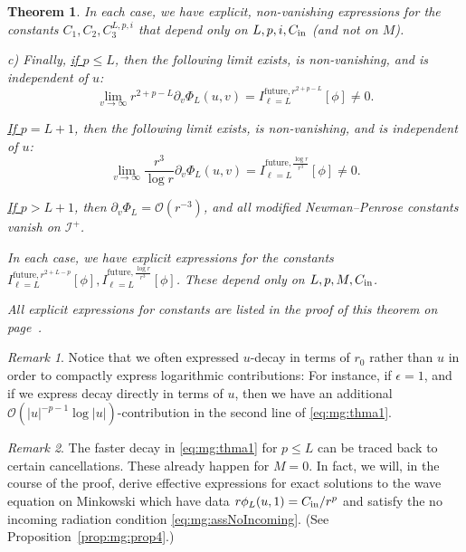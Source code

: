 \documentclass[11pt,english]{article}
\numberwithin{equation}{section}
\newtheorem{thm}{Theorem}[section]
\theoremstyle{remark}
\newtheorem{rem}{Remark}[section]
\theoremstyle{plain}
\theoremstyle{remark}
\newcommand{\pv}{\partial_v}
\renewcommand{\(}{\left(}
\renewcommand{\)}{\right)}
\begin{document}
\begin{thm}
In each case, we have explicit, non-vanishing expressions for the constants $C_1,C_2,C_3^{L,p,i}$ that depend only  on $L,p,i,C_{\mathrm{in}}$ (and not on $M$).

c) Finally, \underline{if $p\leq L$}, then the following limit exists, is non-vanishing, and is independent of $u$:
\begin{equation}\label{eq:mg:thmc1}
\lim_{v\to\infty}r^{2+p-L}\pv\Phi_L(u,v)=I^{\mathrm{future},r^{2+p-L}}_{\ell=L}[\phi]\neq 0.
\end{equation} 

\underline{If $p=L+1$}, then the following limit exists, is non-vanishing, and is independent of $u$:
\begin{equation}\label{eq:mg:thmc2}
\lim_{v\to\infty}\frac{r^3}{\log r}\pv\Phi_L(u,v)=I^{\mathrm{future},\frac{\log r}{r^3}}_{\ell=L}[\phi]\neq 0.
\end{equation} 

\underline{If $p>L+1$}, then $\pv\Phi_L=\mathcal O(r^{-3})$, and all modified Newman--Penrose constants vanish on $\mathcal I^+$.

In each case, we have explicit expressions for the constants $I^{\mathrm{future},r^{2+L-p}}_{\ell=L}[\phi],I^{\mathrm{future},\frac{\log r}{r^3}}_{\ell=L}[\phi]$. These depend only on $L,p,M,C_{\mathrm{in}}$.

All explicit expressions for constants are listed in the proof of this theorem on page~\pageref{auxref}.
\end{thm}
 \begin{rem}
 Notice that we often expressed $u$-decay in terms of $r_0$ rather than $u$ in order to compactly express logarithmic contributions: For instance, if $\epsilon=1$, and if we express decay directly in terms of $u$, then we  have an additional $\mathcal O(|u|^{-p-1}\log |u|)$-contribution in the second line of \eqref{eq:mg:thma1}. 
 \end{rem}
 
\begin{rem}
The faster decay in \eqref{eq:mg:thma1} for $p\leq L$ can be traced back to certain cancellations. These  already happen for $M=0$. In fact, we will, in the course of the proof, derive effective expressions for exact solutions to the wave equation on Minkowski which have data $r\phi_L(u,1)=C_{\mathrm{in}}/r^p$ and satisfy the no incoming radiation condition \eqref{eq:mg:assNoIncoming}. (See Proposition~\ref{prop:mg:prop4}.) 
\end{rem}
\end{document}
